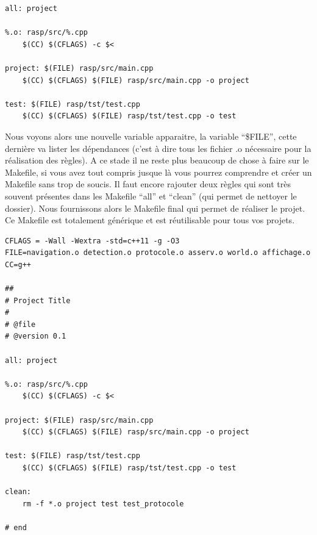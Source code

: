 \documentclass[a4paper,10pt]{article}
\begin{document}
\begin{spacing}{1.5}
\begin{lstlisting}
all: project

%.o: rasp/src/%.cpp
	$(CC) $(CFLAGS) -c $<

project: $(FILE) rasp/src/main.cpp
	$(CC) $(CFLAGS) $(FILE) rasp/src/main.cpp -o project

test: $(FILE) rasp/tst/test.cpp
	$(CC) $(CFLAGS) $(FILE) rasp/tst/test.cpp -o test

\end{lstlisting}
Nous voyons alors une nouvelle variable apparaitre, la variable ``\$FILE'',
cette dernière va lister les dépendances (c'est à dire tous les fichier .o
nécessaire pour la réalisation des règles). A ce stade il ne reste plus beaucoup
de chose à faire sur le Makefile, si vous avez tout compris jusque là vous
pourrez comprendre et créer un Makefile sans trop de soucis. Il faut encore
rajouter deux règles qui sont très souvent présentes dans les Makefile ``all''
et ``clean'' (qui permet de nettoyer le dossier). Nous fournissons alors le
Makefile final qui permet de réaliser le projet. Ce Makefile est totalement
générique et est réutilisable pour tous vos projets.

\begin{lstlisting}
CFLAGS = -Wall -Wextra -std=c++11 -g -O3
FILE=navigation.o detection.o protocole.o asserv.o world.o affichage.o
CC=g++

##
# Project Title
#
# @file
# @version 0.1

all: project

%.o: rasp/src/%.cpp
	$(CC) $(CFLAGS) -c $<

project: $(FILE) rasp/src/main.cpp
	$(CC) $(CFLAGS) $(FILE) rasp/src/main.cpp -o project

test: $(FILE) rasp/tst/test.cpp
	$(CC) $(CFLAGS) $(FILE) rasp/tst/test.cpp -o test

clean:
	rm -f *.o project test test_protocole

# end

\end{lstlisting}
\newpage
\end{spacing}
\end{document}
